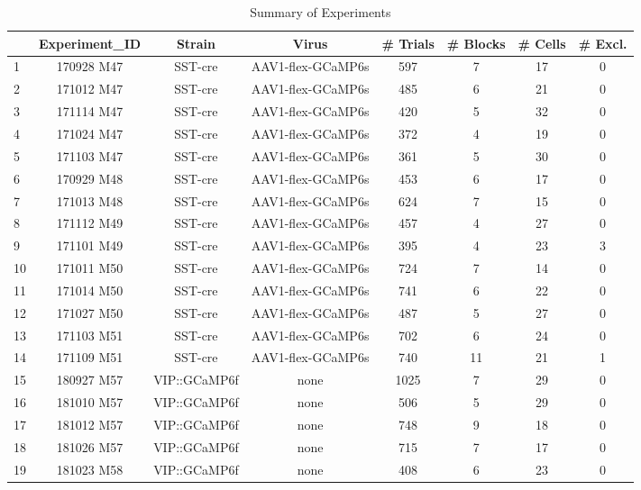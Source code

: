 \begin{table}[htbp]
    \centering
    \caption{Summary of Experiments}
    \tiny
    \begin{tabular}{lccccccc}
          & Experiment\_ID & Strain & Virus &  \# Trials & \# Blocks & \# Cells & \# Excl. \\
          \midrule
    1     & 170928 M47 & SST-cre & AAV1-flex-GCaMP6s & 597   & 7     & 17    & 0 \\
    2     & 171012 M47 & SST-cre & AAV1-flex-GCaMP6s & 485   & 6     & 21    & 0 \\
    3     & 171114 M47 & SST-cre & AAV1-flex-GCaMP6s & 420   & 5     & 32    & 0 \\
    4     & 171024 M47 & SST-cre & AAV1-flex-GCaMP6s & 372   & 4     & 19    & 0 \\
    5     & 171103 M47 & SST-cre & AAV1-flex-GCaMP6s & 361   & 5     & 30    & 0 \\
    6     & 170929 M48 & SST-cre & AAV1-flex-GCaMP6s & 453   & 6     & 17    & 0 \\
    7     & 171013 M48 & SST-cre & AAV1-flex-GCaMP6s & 624   & 7     & 15    & 0 \\
    8     & 171112 M49 & SST-cre & AAV1-flex-GCaMP6s & 457   & 4     & 27    & 0 \\
    9     & 171101 M49 & SST-cre & AAV1-flex-GCaMP6s & 395   & 4     & 23    & 3 \\
    10    & 171011 M50 & SST-cre & AAV1-flex-GCaMP6s & 724   & 7     & 14    & 0 \\
    11    & 171014 M50 & SST-cre & AAV1-flex-GCaMP6s & 741   & 6     & 22    & 0 \\
    12    & 171027 M50 & SST-cre & AAV1-flex-GCaMP6s & 487   & 5     & 27    & 0 \\
    13    & 171103 M51 & SST-cre & AAV1-flex-GCaMP6s & 702   & 6     & 24    & 0 \\
    14    & 171109 M51 & SST-cre & AAV1-flex-GCaMP6s & 740   & 11    & 21    & 1 \\
    15    & 180927 M57 & VIP::GCaMP6f & none  & 1025  & 7     & 29    & 0 \\
    16    & 181010 M57 & VIP::GCaMP6f & none  & 506   & 5     & 29    & 0 \\
    17    & 181012 M57 & VIP::GCaMP6f & none  & 748   & 9     & 18    & 0 \\
    18    & 181026 M57 & VIP::GCaMP6f & none  & 715   & 7     & 17    & 0 \\
    19    & 181023 M58 & VIP::GCaMP6f & none  & 408   & 6     & 23    & 0 \\

\end{tabular}
\end{table}
